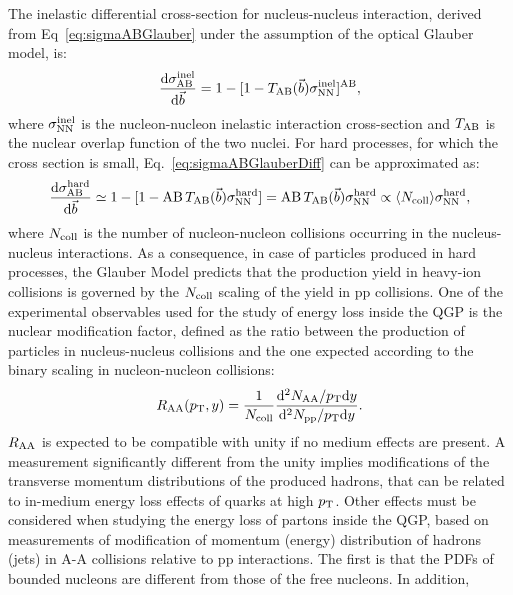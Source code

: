 The inelastic differential cross-section for nucleus-nucleus interaction, derived from Eq~\ref{eq:sigmaABGlauber} 
under the assumption of the optical Glauber model, is:
\begin{equation}
\label{eq:sigmaABGlauberDiff}
\frac{{\rm d}\sigma^{\rm inel}_{\rm AB}}{{\rm d}\vec{b}} = 1 - [1-  T_{\rm AB}(\vec{b})\sigma^{\rm inel}_{\rm NN}]^{\rm AB},
\end{equation}
where $\sigma^{\rm inel}_{\rm NN}$ is the nucleon-nucleon inelastic interaction cross-section
and $T_{\rm AB}$ is the nuclear overlap function of the two nuclei.
For hard processes, for which the cross section is small, Eq.~\ref{eq:sigmaABGlauberDiff} can be approximated as:
\begin{equation}
\label{eq:xsecHardProcesses}
\frac{{\rm d}\sigma^{\rm hard}_{\rm AB}}{{\rm d}\vec{b}} \simeq 1 - [1- {\rm AB}\, T_{\rm AB}(\vec{b})\sigma^{\rm hard}_{\rm NN}] =  {\rm AB} \,T_{\rm AB}(\vec{b})\sigma^{\rm hard}_{\rm NN} \propto \langle N_{\rm coll} \rangle \sigma^{\rm hard}_{\rm NN},
\end{equation}
where $N_{\rm coll}$ is the number of nucleon-nucleon collisions occurring
in the nucleus-nucleus interactions. 
As a consequence, in case of particles produced in hard processes, the 
Glauber Model predicts that the production yield in heavy-ion collisions is governed by the $N_{\rm coll}$ 
scaling of the yield in pp collisions.
One of the experimental observables used for the study of energy loss
 inside the QGP is the nuclear modification factor, defined as the ratio 
 between the production of particles in nucleus-nucleus collisions and 
 the one expected according to the binary scaling in nucleon-nucleon collisions:
\begin{equation}
\label{eq:Raa}
R_{\rm AA} (p_{\rm T}, y) = \frac{1}{N_{\rm coll}}\frac{{\rm d}^2N_{\rm AA}/p_{\rm T} {\rm d}y}{{\rm d}^2N_{\rm pp}/p_{\rm T} {\rm d}y}.
\end{equation}
$R_{\rm AA}$ is expected to be compatible 
with unity if no medium effects are present. A measurement significantly 
different from the unity implies modifications of the transverse momentum 
distributions of the produced hadrons, that can be related to in-medium 
energy loss effects of quarks at high $p_{\rm T}$. Other effects must be considered 
when studying the energy loss of partons inside the QGP, based on
measurements of modification of momentum (energy) distribution of hadrons (jets)
in A-A collisions relative to pp interactions. The first is that the PDFs of 
bounded nucleons are different from those of the free nucleons. In addition, 
